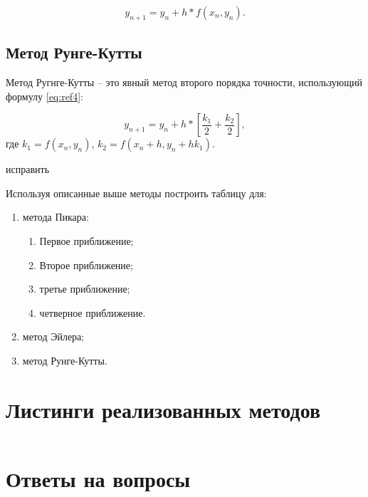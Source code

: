 \documentclass[12pt]{report}
\begin{document}
\begin{equation}
	y_{n+1} = y_n + h*f(x_n, y_n).
	\label{eq:ref3}
\end{equation}


\section{Метод Рунге-Кутты}

Метод Ругнге-Кутты -- это явный метод второго порядка точности, использующий формулу \ref{eq:ref4}:

\begin{equation}
	y_{n+1} = y_n + h*[\frac{k_1}{2} + \frac{k_2}{2}],
	\label{eq:ref4}
\end{equation}
где $k_1 = f(x_n, y_n)$, $k_2 = f(x_n + h, y_n + hk_1)$.

 
 исправить



Используя описанные выше методы построить таблицу для:

\begin{enumerate}
	\item метода Пикара:
	\begin{enumerate}
		\item Первое приближение;
		\item Второе приближение;
		\item третье приближение;
		\item четверное приближение.
	\end{enumerate}
	\item метод Эйлера;
	\item метод Рунге-Кутты.
\end{enumerate}




\chapter{Листинги реализованных методов}

\begin{lstlisting}[language=Python]
\end{lstlisting}


\chapter{Ответы на вопросы}
\end{document}
